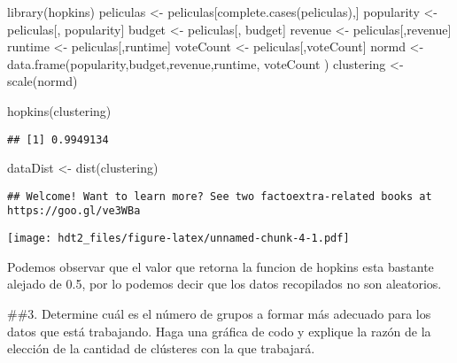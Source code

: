 \documentclass[
]{article}
\newenvironment{Shaded}{\begin{snugshade}}{\end{snugshade}}
\newcommand{\FunctionTok}[1]{\textcolor[rgb]{0.00,0.00,0.00}{#1}}
\newcommand{\NormalTok}[1]{#1}
\newcommand{\OtherTok}[1]{\textcolor[rgb]{0.56,0.35,0.01}{#1}}
\newcommand{\StringTok}[1]{\textcolor[rgb]{0.31,0.60,0.02}{#1}}
\begin{document}
\begin{Shaded}
\begin{Highlighting}[]
\FunctionTok{library}\NormalTok{(hopkins)}
\NormalTok{peliculas }\OtherTok{\textless{}{-}}\NormalTok{ peliculas[}\FunctionTok{complete.cases}\NormalTok{(peliculas),]}
\NormalTok{popularity }\OtherTok{\textless{}{-}}\NormalTok{ peliculas[, }\StringTok{\textquotesingle{}popularity\textquotesingle{}}\NormalTok{]}
\NormalTok{budget }\OtherTok{\textless{}{-}}\NormalTok{ peliculas[, }\StringTok{\textquotesingle{}budget\textquotesingle{}}\NormalTok{]}
\NormalTok{revenue }\OtherTok{\textless{}{-}}\NormalTok{ peliculas[,}\StringTok{\textquotesingle{}revenue\textquotesingle{}}\NormalTok{]}
\NormalTok{runtime }\OtherTok{\textless{}{-}}\NormalTok{ peliculas[,}\StringTok{\textquotesingle{}runtime\textquotesingle{}}\NormalTok{]}
\NormalTok{voteCount }\OtherTok{\textless{}{-}}\NormalTok{ peliculas[,}\StringTok{\textquotesingle{}voteCount\textquotesingle{}}\NormalTok{]}
\NormalTok{normd }\OtherTok{\textless{}{-}} \FunctionTok{data.frame}\NormalTok{(popularity,budget,revenue,runtime, voteCount )}
\NormalTok{clustering }\OtherTok{\textless{}{-}} \FunctionTok{scale}\NormalTok{(normd)}

\FunctionTok{hopkins}\NormalTok{(clustering)}
\end{Highlighting}
\end{Shaded}

\begin{verbatim}
## [1] 0.9949134
\end{verbatim}

\begin{Shaded}
\begin{Highlighting}[]
\NormalTok{dataDist }\OtherTok{\textless{}{-}} \FunctionTok{dist}\NormalTok{(clustering)}
\end{Highlighting}
\end{Shaded}

\begin{verbatim}
## Welcome! Want to learn more? See two factoextra-related books at https://goo.gl/ve3WBa
\end{verbatim}

\texttt{[image: hdt2\_files/figure-latex/unnamed-chunk-4-1.pdf]}

Podemos observar que el valor que retorna la funcion de hopkins esta
bastante alejado de 0.5, por lo podemos decir que los datos recopilados
no son aleatorios.

\#\#3. Determine cuál es el número de grupos a formar más adecuado para
los datos que está trabajando. Haga una gráfica de codo y explique la
razón de la elección de la cantidad de clústeres con la que trabajará.
\end{document}
